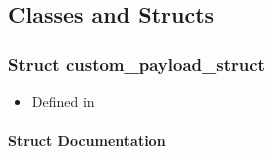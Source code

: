 \documentclass[letterpaper,10pt,english]{sphinxmanual}
\begin{document}
\subsection{Classes and Structs}
\label{\detokenize{cpp_api/cpp_api_root:classes-and-structs}}

\subsubsection{Struct custom\_payload\_struct}
\label{\detokenize{cpp_api/structcustom__payload__struct:struct-custom-payload-struct}}\label{\detokenize{cpp_api/structcustom__payload__struct:exhale-struct-structcustom-payload-struct}}\label{\detokenize{cpp_api/structcustom__payload__struct::doc}}\begin{itemize}
\item {} 
Defined in {\hyperref[\detokenize{cpp_api/file_src_servables_custom_custom.h:file-src-servables-custom-custom-h}]{}}

\end{itemize}


\paragraph{Struct Documentation}
\label{\detokenize{cpp_api/structcustom__payload__struct:struct-documentation}}
\end{document}
